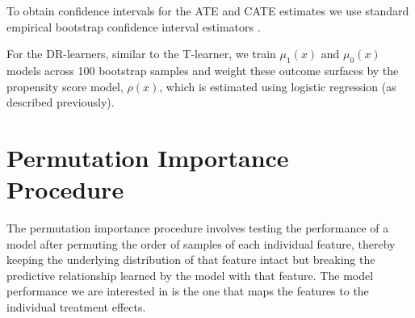 \documentclass[12pt, a4paper]{article}
\begin{document}
To obtain confidence intervals for the ATE and CATE estimates we use standard
empirical bootstrap confidence interval estimators \citep{efron1986}.



For the DR-learners, similar to the T-learner, we train $\mu_1(x)$ and
$\mu_0(x)$ models across 100 bootstrap samples and weight these outcome
surfaces by the propensity score model, $\rho(x)$, which is estimated using
logistic regression (as described previously). 

\clearpage

\section{Permutation Importance Procedure}
\label{app:perm}

The permutation importance procedure involves testing the performance of a
model after permuting the order of samples of each individual feature, thereby
keeping the underlying distribution of that feature intact but breaking the
predictive relationship learned by the model with that feature. The model
performance we are interested in is the one that maps
the features to the individual treatment effects. 
\end{document}
